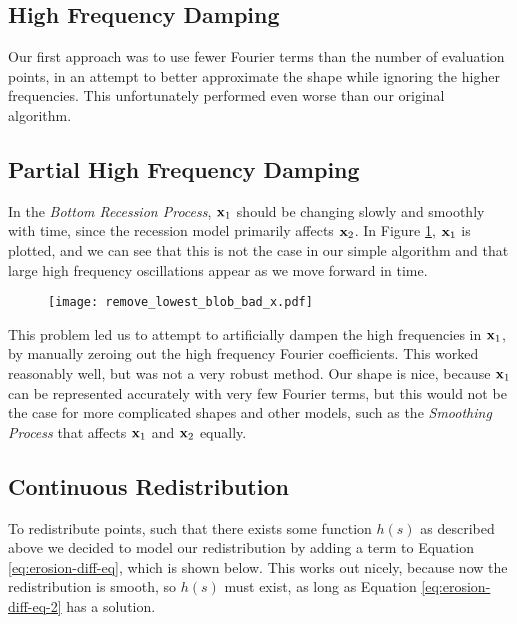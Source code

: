 \subsection*{High Frequency Damping}

Our first approach was to use fewer Fourier terms than the number of evaluation points, in an attempt to better approximate the shape while ignoring the higher frequencies. This unfortunately performed even worse than our original algorithm.

\subsection*{Partial High Frequency Damping}

In the \textit{Bottom Recession Process}, $\mathbf{x}_1$ should be changing slowly and smoothly with time, since the recession model primarily affects $\mathbf{x}_2$. In Figure \ref{fig:remove-lowest-blob-bad-x}, $\mathbf{x}_1$ is plotted, and we can see that this is not the case in our simple algorithm and that large high frequency oscillations appear as we move forward in time. 

\begin{figure}[H]
    \begin{center}
      \texttt{[image: remove\_lowest\_blob\_bad\_x.pdf]}
    \end{center}
  \vspace{-.2in} %
  \caption{\label{fig:remove-lowest-blob-bad-x}}
\end{figure}

This problem led us to attempt to artificially dampen the high frequencies in $\mathbf{x}_1$, by manually zeroing out the high frequency Fourier coefficients. This worked reasonably well, but was not a very robust method. Our shape is nice, because $\mathbf{x}_1$ can be represented accurately with very few Fourier terms, but this would not be the case for more complicated shapes and other models, such as the \textit{Smoothing Process} that affects $\mathbf{x}_1$ and $\mathbf{x}_2$ equally. 

\subsection*{Continuous Redistribution}

To redistribute points, such that there exists some function $h(s)$ as described above we decided to model our redistribution by adding a term to Equation \ref{eq:erosion-diff-eq}, which is shown below. This works out nicely, because now the redistribution is smooth, so $h(s)$ must exist, as long as Equation \ref{eq:erosion-diff-eq-2} has a solution.

